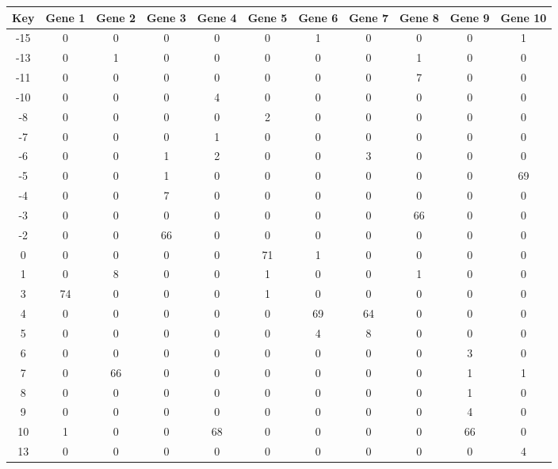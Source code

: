 \begin{tabular}{|c|c|c|c|c|c|c|c|c|c|c|}
\hline
Key & Gene 1 & Gene 2 & Gene 3 & Gene 4 & Gene 5 & Gene 6 & Gene 7 & Gene 8 & Gene 9 & Gene 10 \\
\hline
-15 & 0 & 0 & 0 & 0 & 0 & 1 & 0 & 0 & 0 & 1 \\
-13 & 0 & 1 & 0 & 0 & 0 & 0 & 0 & 1 & 0 & 0 \\
-11 & 0 & 0 & 0 & 0 & 0 & 0 & 0 & 7 & 0 & 0 \\
-10 & 0 & 0 & 0 & 4 & 0 & 0 & 0 & 0 & 0 & 0 \\
-8 & 0 & 0 & 0 & 0 & 2 & 0 & 0 & 0 & 0 & 0 \\
-7 & 0 & 0 & 0 & 1 & 0 & 0 & 0 & 0 & 0 & 0 \\
-6 & 0 & 0 & 1 & 2 & 0 & 0 & 3 & 0 & 0 & 0 \\
-5 & 0 & 0 & 1 & 0 & 0 & 0 & 0 & 0 & 0 & 69 \\
-4 & 0 & 0 & 7 & 0 & 0 & 0 & 0 & 0 & 0 & 0 \\
-3 & 0 & 0 & 0 & 0 & 0 & 0 & 0 & 66 & 0 & 0 \\
-2 & 0 & 0 & 66 & 0 & 0 & 0 & 0 & 0 & 0 & 0 \\
0 & 0 & 0 & 0 & 0 & 71 & 1 & 0 & 0 & 0 & 0 \\
1 & 0 & 8 & 0 & 0 & 1 & 0 & 0 & 1 & 0 & 0 \\
3 & 74 & 0 & 0 & 0 & 1 & 0 & 0 & 0 & 0 & 0 \\
4 & 0 & 0 & 0 & 0 & 0 & 69 & 64 & 0 & 0 & 0 \\
5 & 0 & 0 & 0 & 0 & 0 & 4 & 8 & 0 & 0 & 0 \\
6 & 0 & 0 & 0 & 0 & 0 & 0 & 0 & 0 & 3 & 0 \\
7 & 0 & 66 & 0 & 0 & 0 & 0 & 0 & 0 & 1 & 1 \\
8 & 0 & 0 & 0 & 0 & 0 & 0 & 0 & 0 & 1 & 0 \\
9 & 0 & 0 & 0 & 0 & 0 & 0 & 0 & 0 & 4 & 0 \\
10 & 1 & 0 & 0 & 68 & 0 & 0 & 0 & 0 & 66 & 0 \\
13 & 0 & 0 & 0 & 0 & 0 & 0 & 0 & 0 & 0 & 4 \\
\hline
\end{tabular}